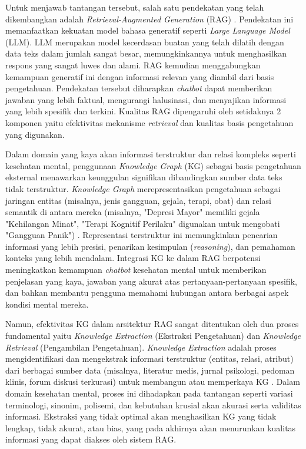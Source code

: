 Untuk menjawab tantangan tersebut, salah satu pendekatan yang telah dikembangkan adalah \textit{Retrieval-Augmented Generation} (RAG) \cite{Lewis2021RAGKnowledgeIntensiveNLP}.
Pendekatan ini memanfaatkan kekuatan model bahasa generatif seperti \textit{Large Language Model} (LLM).
LLM merupakan model kecerdasan buatan yang telah dilatih dengan data teks dalam jumlah sangat besar, memungkinkannya untuk menghasilkan respons yang sangat luwes dan alami.
RAG kemudian menggabungkan kemampuan generatif ini dengan informasi relevan yang diambil dari basis pengetahuan.
Pendekatan tersebut diharapkan \textit{chatbot} dapat memberikan jawaban yang lebih faktual, mengurangi halusinasi, dan menyajikan informasi yang lebih spesifik dan terkini.
Kualitas RAG dipengaruhi oleh setidaknya 2 komponen yaitu efektivitas mekanisme \textit{retrieval} dan kualitas basis pengetahuan yang digunakan.

Dalam domain yang kaya akan informasi terstruktur dan relasi kompleks seperti kesehatan mental, penggunaan \textit{Knowledge Graph} (KG) sebagai basis pengetahuan eksternal menawarkan keunggulan signifikan dibandingkan sumber data teks tidak terstruktur.
\textit{Knowledge Graph} merepresentasikan pengetahuan sebagai jaringan entitas (misalnya, jenis gangguan, gejala, terapi, obat) dan relasi semantik di antara mereka
(misalnya, "Depresi Mayor" memiliki gejala "Kehilangan Minat", "Terapi Kognitif Perilaku" digunakan untuk mengobati "Gangguan Panik") \cite{Chen2020ReviewKnowldgeReasoningOverKnowledgeGraph}.
Representasi terstruktur ini memungkinkan pencarian informasi yang lebih presisi, penarikan kesimpulan (\textit{reasoning}), dan pemahaman konteks yang lebih mendalam.
Integrasi KG ke dalam RAG berpotensi meningkatkan kemampuan \textit{chatbot} kesehatan mental untuk memberikan penjelasan yang kaya, jawaban yang akurat atas pertanyaan-pertanyaan spesifik, dan bahkan membantu pengguna memahami hubungan antara berbagai aspek kondisi mental mereka.

Namun, efektivitas KG dalam arsitektur RAG sangat ditentukan oleh dua proses fundamental yaitu \textit{Knowledge Extraction} (Ekstraksi Pengetahuan) dan \textit{Knowledge Retrieval} (Pengambilan Pengetahuan).
\textit{Knowledge Extraction} adalah proses mengidentifikasi dan mengekstrak informasi terstruktur (entitas, relasi, atribut) dari berbagai sumber data (misalnya, literatur medis, jurnal psikologi, pedoman klinis, forum diskusi terkurasi) untuk membangun atau memperkaya KG \cite{Choi2025KnowledgeGraphConstruction}.
Dalam domain kesehatan mental, proses ini dihadapkan pada tantangan seperti variasi terminologi, sinonim, polisemi, dan kebutuhan krusial akan akurasi serta validitas informasi.
Ekstraksi yang tidak optimal akan menghasilkan KG yang tidak lengkap, tidak akurat, atau bias, yang pada akhirnya akan menurunkan kualitas informasi yang dapat diakses oleh sistem RAG.

